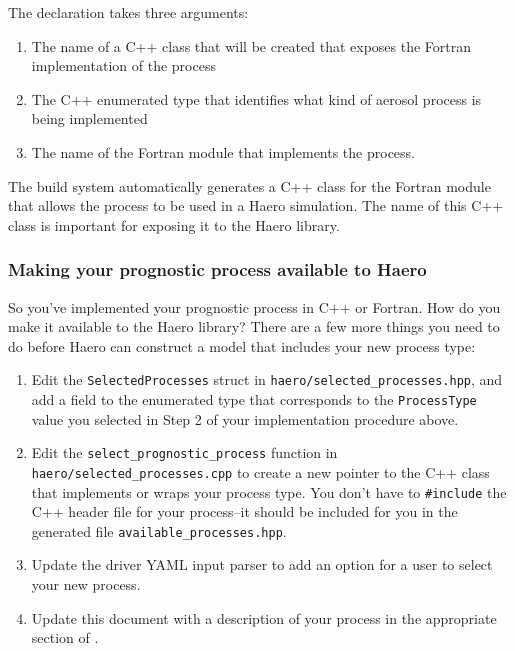 The declaration takes three arguments:

\begin{enumerate}
  \item The name of a C++ class that will be created that exposes the Fortran
        implementation of the process
  \item The C++ enumerated type that identifies what kind of aerosol process
        is being implemented
  \item The name of the Fortran module that implements the process.
\end{enumerate}

The build system automatically generates a C++ class for the Fortran module that
allows the process to be used in a Haero simulation. The name of this C++ class
is important for exposing it to the Haero library.

\subsubsection{Making your prognostic process available to Haero}

So you've implemented your prognostic process in C++ or Fortran. How do you
make it available to the Haero library? There are a few more things you need to
do before Haero can construct a model that includes your new process type:

\begin{enumerate}
  \item Edit the \texttt{SelectedProcesses} struct in
        \texttt{haero/selected\_processes.hpp}, and add a field to the enumerated
        type that corresponds to the \texttt{ProcessType} value you selected in
        Step 2 of your implementation procedure above.
  \item Edit the \texttt{select\_prognostic\_process} function in
        \texttt{haero/selected\_processes.cpp} to create a new pointer to the C++
        class that implements or wraps your process type. You don't have to
        \texttt{\#include} the C++ header file for your process--it should be
        included for you in the generated file \texttt{available\_processes.hpp}.
  \item Update the driver YAML input parser to add an option for a user
        to select your new process.
  \item Update this document with a description of your process in the
        appropriate section of .
\end{enumerate}

